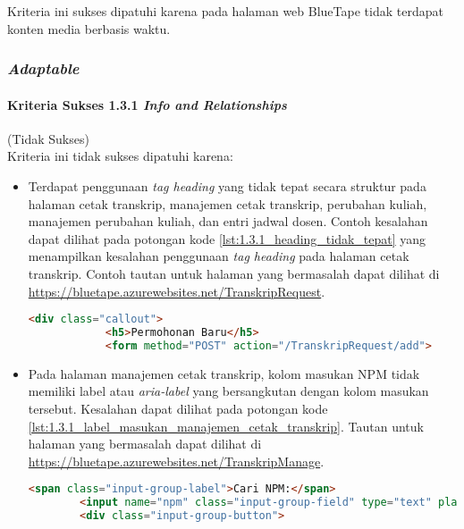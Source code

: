Kriteria ini sukses dipatuhi karena pada halaman web BlueTape tidak terdapat konten media berbasis waktu.

\subsubsection{\textit{Adaptable}}
\label{subsubsec:kepatuhan_bluetape_adaptable}

\paragraph{Kriteria Sukses 1.3.1 \textit{Info and Relationships}}
\label{par:kepatuhan_bluetape_kriteria_sukses_1.3.1}
(Tidak Sukses)\\

Kriteria ini tidak sukses dipatuhi karena:
\begin{itemize}
    \item Terdapat penggunaan \textit{tag heading} yang tidak tepat secara struktur pada halaman cetak transkrip, manajemen cetak transkrip, perubahan kuliah, manajemen perubahan kuliah, dan entri jadwal dosen. Contoh kesalahan dapat dilihat pada potongan kode \ref{lst:1.3.1_heading_tidak_tepat} yang menampilkan kesalahan penggunaan \textit{tag heading} pada halaman cetak transkrip. Contoh tautan untuk halaman yang bermasalah dapat dilihat di \url{https://bluetape.azurewebsites.net/TranskripRequest}.
    \begin{lstlisting}[frame=single, label={lst:1.3.1_heading_tidak_tepat}, language=HTML, caption=Kriteria Sukses 1.3.1 - Penggunaan \textit{Heading} Tidak Tepat]
        <div class="callout">
            <h5>Permohonan Baru</h5>
            <form method="POST" action="/TranskripRequest/add">
    \end{lstlisting}

    \item Pada halaman manajemen cetak transkrip, kolom masukan NPM tidak memiliki label atau \textit{aria-label} yang bersangkutan dengan kolom masukan tersebut. Kesalahan dapat dilihat pada potongan kode \ref{lst:1.3.1_label_masukan_manajemen_cetak_transkrip}. Tautan untuk halaman yang bermasalah dapat dilihat di \url{https://bluetape.azurewebsites.net/TranskripManage}.
    \begin{lstlisting}[frame=single, label={lst:1.3.1_label_masukan_manajemen_cetak_transkrip}, language=HTML, caption=Kriteria Sukses 1.3.1 - Tidak Terdapat Label pada Kolom Masukan di Halaman Manajemen Cetak Transkrip]
        <span class="input-group-label">Cari NPM:</span>
        <input name="npm" class="input-group-field" type="text" placeholder="2013730013" maxlength="10" minlength="10"/>
        <div class="input-group-button">
    \end{lstlisting}


\end{itemize}
